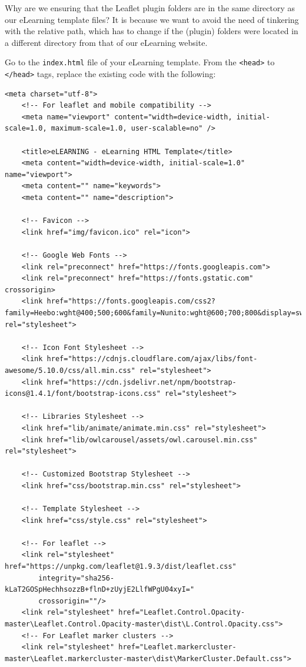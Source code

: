 \documentclass[
]{book}
\begin{document}
Why are we ensuring that the Leaflet plugin folders are in the same directory as our eLearning template files? It is because we want to avoid the need of tinkering with the relative path, which has to change if the (plugin) folders were located in a different directory from that of our eLearning website.

Go to the \texttt{index.html} file of your eLearning template. From the \texttt{\textless{}head\textgreater{}} to \texttt{\textless{}/head\textgreater{}} tags, replace the existing code with the following:

\begin{verbatim}
<meta charset="utf-8">
    <!-- For leaflet and mobile compatibility -->
    <meta name="viewport" content="width=device-width, initial-scale=1.0, maximum-scale=1.0, user-scalable=no" />

    <title>eLEARNING - eLearning HTML Template</title>
    <meta content="width=device-width, initial-scale=1.0" name="viewport">
    <meta content="" name="keywords">
    <meta content="" name="description">

    <!-- Favicon -->
    <link href="img/favicon.ico" rel="icon">

    <!-- Google Web Fonts -->
    <link rel="preconnect" href="https://fonts.googleapis.com">
    <link rel="preconnect" href="https://fonts.gstatic.com" crossorigin>
    <link href="https://fonts.googleapis.com/css2?family=Heebo:wght@400;500;600&family=Nunito:wght@600;700;800&display=swap" rel="stylesheet">

    <!-- Icon Font Stylesheet -->
    <link href="https://cdnjs.cloudflare.com/ajax/libs/font-awesome/5.10.0/css/all.min.css" rel="stylesheet">
    <link href="https://cdn.jsdelivr.net/npm/bootstrap-icons@1.4.1/font/bootstrap-icons.css" rel="stylesheet">

    <!-- Libraries Stylesheet -->
    <link href="lib/animate/animate.min.css" rel="stylesheet">
    <link href="lib/owlcarousel/assets/owl.carousel.min.css" rel="stylesheet">

    <!-- Customized Bootstrap Stylesheet -->
    <link href="css/bootstrap.min.css" rel="stylesheet">

    <!-- Template Stylesheet -->
    <link href="css/style.css" rel="stylesheet">

    <!-- For leaflet -->
    <link rel="stylesheet" href="https://unpkg.com/leaflet@1.9.3/dist/leaflet.css"
        integrity="sha256-kLaT2GOSpHechhsozzB+flnD+zUyjE2LlfWPgU04xyI="
        crossorigin=""/>
    <link rel="stylesheet" href="Leaflet.Control.Opacity-master\Leaflet.Control.Opacity-master\dist\L.Control.Opacity.css">
    <!-- For Leaflet marker clusters -->
    <link rel="stylesheet" href="Leaflet.markercluster-master\Leaflet.markercluster-master\dist\MarkerCluster.Default.css">  


\end{verbatim}
\end{document}
